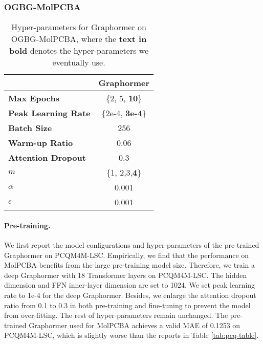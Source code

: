 \documentclass{article}
\begin{document}
\subsubsection{OGBG-MolPCBA}


\begin{table*}[ht]
\centering 
\caption{Hyper-parameters for Graphormer on OGBG-MolPCBA, where the \textbf{text in bold} denotes the hyper-parameters we eventually use. } \label{tab:pcba_details}
\begin{threeparttable}
\begin{tabular}{lc}
\toprule
& Graphormer \\ \hline
\textbf{Max Epochs} & \{2, 5, \textbf{10}\} \\
\textbf{Peak Learning Rate} & \{2e-4, \textbf{3e-4}\}  \\ 
\textbf{Batch Size} & 256 \\ 
\textbf{Warm-up Ratio} & 0.06 \\ 
\textbf{Attention Dropout} & 0.3 \\ 
\textbf{$m$} & \{1, 2,3,\textbf{4}\} \\ 
\textbf{$\alpha$} & 0.001 \\ 
\textbf{$\epsilon$} & 0.001 \\ 
\bottomrule
\end{tabular}
\end{threeparttable}
\end{table*}



\paragraph{Pre-training.} We first report the model configurations and hyper-parameters of the pre-trained Graphormer on PCQM4M-LSC. Empirically, we find that the performance on MolPCBA benefits from the large pre-training model size. Therefore, we train a deep Graphormer with 18 Transformer layers on PCQM4M-LSC. The hidden dimension and FFN inner-layer dimension are set to 1024. We set peak learning rate to 1e-4 for the deep Graphormer. Besides, we enlarge the attention dropout ratio from 0.1 to 0.3 in both pre-training and fine-tuning to prevent the model from over-fitting. The rest of hyper-parameters remain unchanged. The pre-trained Graphormer used for MolPCBA achieves a valid MAE of 0.1253 on PCQM4M-LSC, which is slightly worse than the reports in Table \ref{tab:pcq-table}. 
\end{document}
